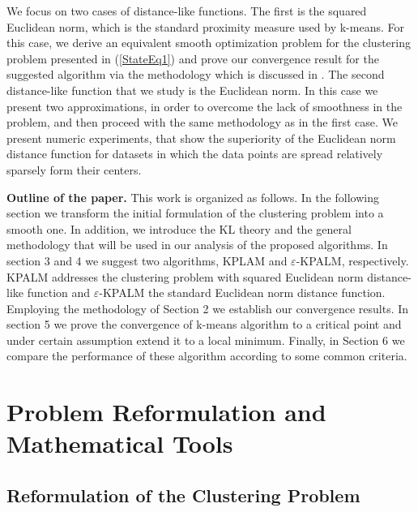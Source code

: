 \documentclass[12pt]{article}
\numberwithin{equation}{section}
\begin{document}
We focus on two cases of distance-like functions. The first is the squared Euclidean norm, which is the standard proximity measure used by k-means. For this case, we derive an equivalent smooth optimization problem for the clustering problem presented in (\ref{StateEq1}) and prove our convergence result for the suggested algorithm via the methodology which is discussed in \cite{BST2014}. The second distance-like function that we study is the Euclidean norm. In this case we present two approximations, in order to overcome the lack of smoothness in the problem, and then proceed with the same methodology as in the first case. We present numeric experiments, that show the superiority of the Euclidean norm distance function for datasets in which the data points are spread relatively sparsely form their centers.

\noindent \textbf{Outline of the paper.} This work is organized as follows. In the following section we transform the initial formulation  of the clustering problem into a smooth one. In addition, we introduce 
the KL theory and the general methodology that will be used in our analysis of the proposed algorithms. In section 3 and 4 we suggest two algorithms, KPLAM and $\varepsilon$-KPALM, respectively. KPALM addresses the clustering problem with squared Euclidean norm distance-like function and $\varepsilon$-KPALM the standard Euclidean norm distance function. Employing the methodology of Section 2 we establish our convergence results.  In section 5 we prove the convergence of k-means algorithm to a critical point and under certain assumption extend it to a local minimum. Finally, in Section 6 we compare the performance of these algorithm according to some common criteria.

\section{Problem Reformulation and Mathematical Tools}

\subsection{Reformulation of the Clustering Problem}
\end{document}

